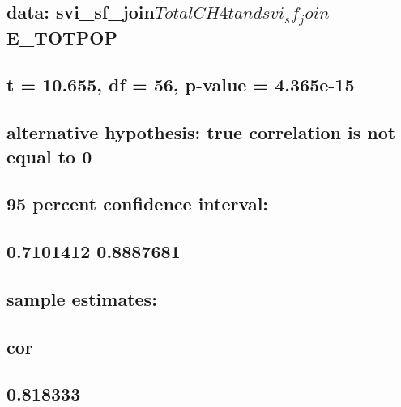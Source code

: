 \documentclass[
  12pt,
]{article}
\begin{document}
\hypertarget{data-svi_sf_jointotalch4t-and-svi_sf_joine_totpop}{%
\subsection{\texorpdfstring{data:
svi\_sf\_join\(TotalCH4t and svi_sf_join\)E\_TOTPOP}{data: svi\_sf\_joinTotalCH4t and svi\_sf\_joinE\_TOTPOP}}\label{data-svi_sf_jointotalch4t-and-svi_sf_joine_totpop}}

\hypertarget{t-10.655-df-56-p-value-4.365e-15}{%
\subsection{t = 10.655, df = 56, p-value =
4.365e-15}\label{t-10.655-df-56-p-value-4.365e-15}}

\hypertarget{alternative-hypothesis-true-correlation-is-not-equal-to-0}{%
\subsection{alternative hypothesis: true correlation is not equal to
0}\label{alternative-hypothesis-true-correlation-is-not-equal-to-0}}

\hypertarget{percent-confidence-interval}{%
\subsection{95 percent confidence
interval:}\label{percent-confidence-interval}}

\hypertarget{section-2}{%
\subsection{0.7101412 0.8887681}\label{section-2}}

\hypertarget{sample-estimates}{%
\subsection{sample estimates:}\label{sample-estimates}}

\hypertarget{cor}{%
\subsection{cor}\label{cor}}

\hypertarget{section-3}{%
\subsection{0.818333}\label{section-3}}
\end{document}
